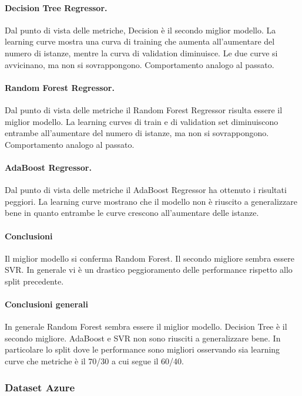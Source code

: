 \paragraph{\textbf{Decision Tree Regressor}.}
Dal punto di vista delle metriche, Decision è il secondo miglior modello.
La learning curve mostra una curva di training che aumenta all'aumentare del numero di istanze, mentre la curva di validation diminuisce. Le due curve si avvicinano, ma non si sovrappongono. Comportamento analogo al passato.
\paragraph{\textbf{Random Forest Regressor}.}
Dal punto di vista delle metriche il Random Forest Regressor risulta essere il miglior modello.
La learning curves di train e di validation set diminuiscono entrambe all'aumentare del numero di istanze, ma non si sovrappongono. Comportamento analogo al passato.
\paragraph{\textbf{AdaBoost Regressor}.}
Dal punto di vista delle metriche il AdaBoost Regressor ha ottenuto i risultati peggiori.
La learning curve mostrano che il modello non è riuscito a generalizzare bene in quanto entrambe le curve crescono all'aumentare delle istanze.


\paragraph{\textbf{Conclusioni}} Il miglior modello si conferma Random Forest. Il secondo migliore sembra essere SVR. In generale vi è un drastico peggioramento delle performance rispetto allo split precedente.



\paragraph{\textbf{Conclusioni generali}} 
In generale Random Forest sembra essere il miglior modello. Decision Tree è il secondo migliore. AdaBoost e SVR non sono riusciti a generalizzare bene. In particolare lo split dove le performance sono migliori osservando sia learning curve che metriche è il 70/30 a cui segue il 60/40.


\subsubsection{Dataset Azure}

